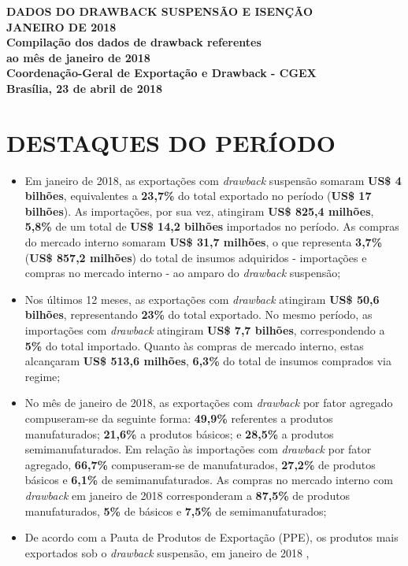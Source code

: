 \documentclass[12pt,a4paper,notitlepage]{report}
\renewcommand{\baselinestretch}{1}
\newcommand*{\titleAT}
{\begingroup %
\thispagestyle{capa}
\newlength{\drop} %
\drop=0.1\textheight %
\vspace*{2\drop} %
\centering %
\Large{\bf{DADOS DO DRAWBACK SUSPENSÃO E ISENÇÃO}} \\
\vspace{0.25\drop}
\Large{\bf{JANEIRO DE 2018}} \\
\vspace{2.75\drop}
\renewcommand{\baselinestretch}{1.5}
\normalsize\bf{Compilação dos dados de drawback referentes} \\
\normalsize\bf{ao mês de janeiro de 2018} \\
\vspace{1.5\drop}
\normalsize\bf{Coordenação-Geral de Exportação e Drawback - CGEX} \\
\normalsize\bf{Brasília, 23 de abril de 2018} \\
\endgroup}
\begin{document}
\titleAT

\tableofcontents

\pagestyle{texto}

\newpage

\chapter{DESTAQUES DO PERÍODO}\label{destaques-do-periodo}

\begin{itemize}
\item
  Em janeiro de 2018, as exportações com \emph{drawback} suspensão
  somaram \textbf{US\$ 4 bilhões}, equivalentes a \textbf{23,7\%} do
  total exportado no período (\textbf{US\$ 17 bilhões}). As importações,
  por sua vez, atingiram \textbf{US\$ 825,4 milhões}, \textbf{5,8\%} de
  um total de \textbf{US\$ 14,2 bilhões} importados no período. As
  compras do mercado interno somaram \textbf{US\$ 31,7 milhões}, o que
  representa \textbf{3,7\%} (\textbf{US\$ 857,2 milhões}) do total de
  insumos adquiridos - importações e compras no mercado interno - ao
  amparo do \emph{drawback} suspensão;
\item
  Nos últimos 12 meses, as exportações com \emph{drawback} atingiram
  \textbf{US\$ 50,6 bilhões}, representando \textbf{23\%} do total
  exportado. No mesmo período, as importações com \emph{drawback}
  atingiram \textbf{US\$ 7,7 bilhões}, correspondendo a \textbf{5\%} do
  total importado. Quanto às compras de mercado interno, estas
  alcançaram \textbf{US\$ 513,6 milhões}, \textbf{6,3\%} do total de
  insumos comprados via regime;
\item
  No mês de janeiro de 2018, as exportações com \emph{drawback} por
  fator agregado compuseram-se da seguinte forma: \textbf{49,9\%}
  referentes a produtos manufaturados; \textbf{21,6\%} a produtos
  básicos; e \textbf{28,5\%} a produtos semimanufaturados. Em relação às
  importações com \emph{drawback} por fator agregado, \textbf{66,7\%}
  compuseram-se de manufaturados, \textbf{27,2\%} de produtos básicos e
  \textbf{6,1\%} de semimanufaturados. As compras no mercado interno com
  \emph{drawback} em janeiro de 2018 corresponderam a \textbf{87,5\%}
  de produtos manufaturados, \textbf{5\%} de básicos e \textbf{7,5\%} de
  semimanufaturados;
\item
  De acordo com a Pauta de Produtos de Exportação (PPE), os produtos
  mais exportados sob o \emph{drawback} suspensão, em janeiro de 2018 ,

\end{itemize}
\end{document}

